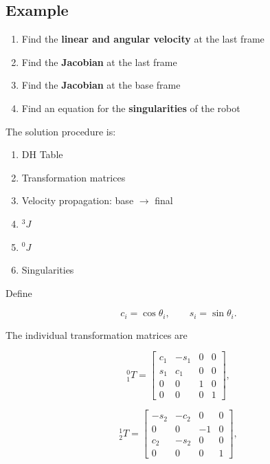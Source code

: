 \documentclass{article}
\begin{document}
\subsection{Example}
\begin{enumerate}
    \item[(a)] Find the \textbf{linear and angular velocity} at the last frame

    \item[(b)] Find the \textbf{Jacobian} at the last frame

    \item[(c)] Find the \textbf{Jacobian} at the base frame

    \item[(d)] Find an equation for the \textbf{singularities} of the robot
\end{enumerate}

\vspace{0.5cm}

\noindent
The solution procedure is:

\begin{enumerate}
    \item DH Table
    \item Transformation matrices
    \item Velocity propagation: base $\rightarrow$ final
    \item ${}^{3}J$
    \item ${}^{0}J$
    \item Singularities
\end{enumerate}

\vspace{1cm}

Define

\[
c_i = \cos\theta_i,
\qquad
s_i = \sin\theta_i.
\]

The individual transformation matrices are

\[
{}^{0}_{1}T =
\begin{bmatrix}
c_1 & -s_1 & 0 & 0 \\
s_1 &  c_1 & 0 & 0 \\
0   &  0   & 1 & 0 \\
0   &  0   & 0 & 1
\end{bmatrix},
\]

\[
{}^{1}_{2}T =
\begin{bmatrix}
-s_2 & -c_2 & 0  & 0 \\
0    & 0    & -1 & 0 \\
c_2  & -s_2 & 0  & 0 \\
0    & 0    & 0  & 1
\end{bmatrix},
\]
\end{document}
